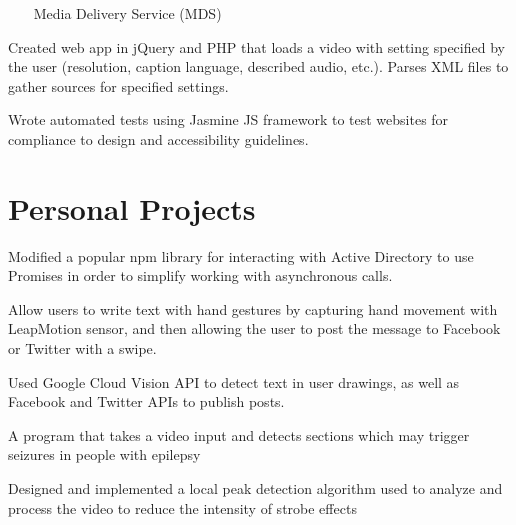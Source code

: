 \documentclass[]{deedy-resume-openfont}
\begin{document}
\begin{minipage}[t]{0.66\textwidth}
~~~ Media Delivery Service (MDS)
\begin{tightemize}
\item Created web app in jQuery and PHP that loads a video with setting specified by the user (resolution, caption language, described audio, etc.). Parses XML files to gather sources for specified settings.
\item Wrote automated tests using Jasmine JS framework to test websites for compliance to design and accessibility guidelines.
\end{tightemize}
\sectionsep


\section{Personal Projects}


\begin{tightemize}
\item Modified a popular npm library for interacting with Active Directory to use Promises in order to simplify working with asynchronous calls.
\end{tightemize}
\sectionsep


\begin{tightemize}
\item Allow users to write text with hand gestures by capturing hand movement with LeapMotion sensor, and then allowing the user to post the message to Facebook or Twitter with a swipe. 
\item Used Google Cloud Vision API to detect text in user drawings, as well as Facebook and Twitter APIs to publish posts.
\end{tightemize}
\sectionsep

\begin{tightemize}
\item A program that takes a video input and detects sections which may trigger seizures in people with epilepsy
\item Designed and implemented a local peak detection algorithm used to analyze and process the video to reduce the intensity of strobe effects 
\end{tightemize}
\sectionsep


\end{minipage} 
\end{document}
